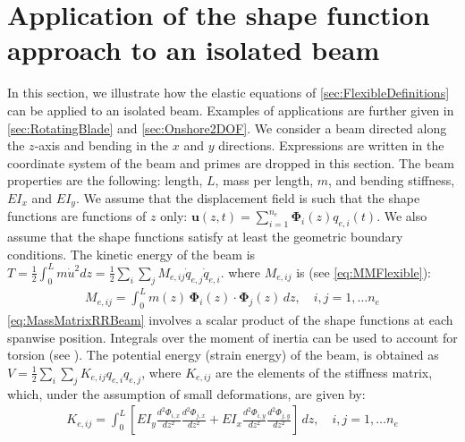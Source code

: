 \documentclass[wes, manuscript]{copernicus}
\renewcommand{\v}[1]{\boldsymbol{#1}}
\begin{document}
\section{Application of the shape function approach to an isolated beam}
\label{sec:ShapeFunctionApproachBeam}
In this section, we illustrate how the elastic equations of \autoref{sec:FlexibleDefinitions} can be applied to an isolated beam. 
Examples of applications are further given in \autoref{sec:RotatingBlade} and \autoref{sec:Onshore2DOF}.
We consider a beam directed along the $z$-axis and bending in the $x$ and $y$ directions.
Expressions are written in the coordinate system of the beam and primes are dropped in this section.
The beam properties are the following: length, $L$, mass per length, $m$, and bending stiffness, $EI_x$ and $EI_y$.
We assume that the displacement field is such that the shape functions are functions of $z$ only:
  $  \v{u}(z,t) = \sum_{i=1}^{n_e} \v{\Phi}_i(z) q_{e,i}(t)$.
We also assume that the shape functions satisfy at least the geometric boundary conditions. 
% 
The kinetic energy of the beam is $T= \frac{1}{2}\int_0^L m \dot{u}^2 dz=\frac{1}{2}\sum_i\sum_j M_{e,ij} \dot{q}_{e,j}\dot{q}_{e,i}$.
where $M_{e,ij}$ is (see \autoref{eq:MMFlexible}):
\begin{align}
  M_{e,ij} = \int_0^L m(z)\, \v{\Phi}_i(z)\cdot \v{\Phi}_j(z)\,dz 
      ,\quad i,j=1,\ldots n_e
      \label{eq:MassMatrixRRBeam}
\end{align}
\autoref{eq:MassMatrixRRBeam} involves a scalar product of the shape functions at each spanwise position.
    Integrals over the moment of inertia can be used to account for torsion (see \cite{branlard:2019flex}).
The potential energy (strain energy) of the beam, is obtained as $V=\frac{1}{2} \sum_i \sum_j K_{e,ij}q_{e,i} q_{e,j}$, where $K_{e,ij}$ are the elements of the stiffness matrix, which, under the assumption of small deformations, are given by:
\begin{align}
    K_{e,ij} = \int_{0}^L \left[EI_y \frac{d^2 \Phi_{i,x}}{dz^2} \frac{d^2 \Phi_{j,x}}{dz^2} + EI_x \frac{d^2 \Phi_{i,y}}{dz^2} \frac{d^2 \Phi_{j,y}}{dz^2}\right] \, dz
      ,\quad i,j=1,\ldots n_e
      \label{eq:stiffnessMatrixRRBeam}
\end{align}
\end{document}
